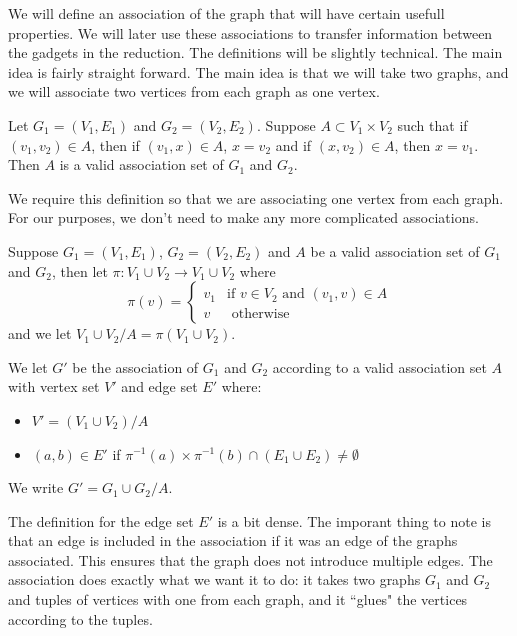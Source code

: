 \documentclass[runningheads,a4paper]{llncs}
\begin{document}

We will define an association of the graph that will have certain usefull properties. We will later use these associations to transfer information between the gadgets in the reduction. The definitions will be slightly technical. The main idea is fairly straight forward. The main idea is that we will take two graphs, and we will associate two vertices from each graph as one vertex. 

\begin{definition}
Let $G_1 = (V_1, E_1)$ and $G_2 = (V_2, E_2)$. Suppose $A \subset V_1 \times V_2$ such that
if $(v_1, v_2) \in A$, then if $(v_1, x) \in A$, $x = v_2$ and if $(x, v_2) \in A$, then $x = v_1$. Then $A$ is a valid association set of $G_1$ and $G_2$. 
\end{definition}

We require this definition so that we are associating one vertex from each graph. For our purposes, we don't need to make any more complicated associations.

\begin{definition}
Suppose $G_1 = (V_1, E_1)$, $G_2 = (V_2, E_2)$ and $A$ be a valid association set of $G_1$ and $G_2$, then let $\pi: V_1 \cup V_2 \rightarrow V_1 \cup V_2$ where
\[ \pi(v) = \left\{ \begin{array}{cc} v_1 & \text{if } v \in V_2 \text{ and } (v_1, v) \in A \\
							v & \text{ otherwise }
						      \end{array} \right. \]
and we let $V_1 \cup V_2 / A = \pi(V_1 \cup V_2)$.
\end{definition}

\begin{definition}
We let $G'$ be the association of $G_1$ and $G_2$ according to a valid association set $A$ with vertex set $V'$ and edge set $E'$ where:
\begin{itemize}
\item $V' = (V_1 \cup V_2) / A$
\item $(a,b) \in E'$ if $\pi^{-1}(a) \times \pi^{-1}(b) \cap (E_1 \cup E_2) \neq \emptyset$
\end{itemize}
We write $G' = G_1 \cup G_2 / A$.
\end{definition}

The definition for the edge set $E'$ is a bit dense. The imporant thing to note is that an edge is included in the association if it was an edge of the graphs associated. This ensures that the graph does not introduce multiple edges. The association does exactly what we want it to do: it takes two graphs $G_1$ and $G_2$ and tuples of vertices with one from each graph, and it ``glues" the vertices according to the tuples. 
\end{document}
